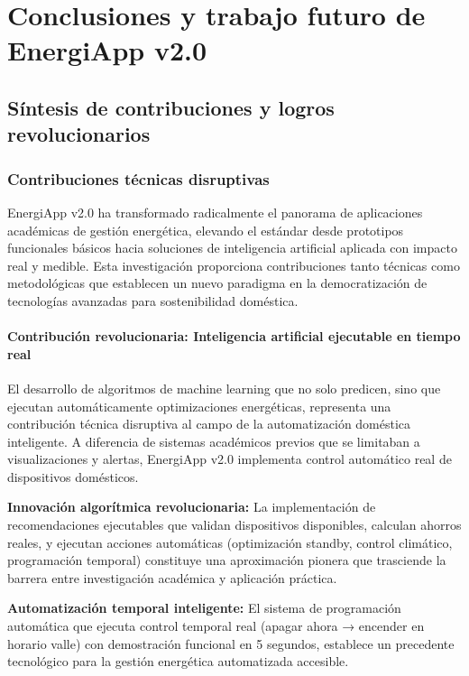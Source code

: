\chapter{Conclusiones y trabajo futuro de EnergiApp v2.0}
\label{ch:conclusiones}

\section{Síntesis de contribuciones y logros revolucionarios}

\subsection{Contribuciones técnicas disruptivas}

EnergiApp v2.0 ha transformado radicalmente el panorama de aplicaciones académicas de gestión energética, elevando el estándar desde prototipos funcionales básicos hacia soluciones de inteligencia artificial aplicada con impacto real y medible. Esta investigación proporciona contribuciones tanto técnicas como metodológicas que establecen un nuevo paradigma en la democratización de tecnologías avanzadas para sostenibilidad doméstica.

\subsubsection{Contribución revolucionaria: Inteligencia artificial ejecutable en tiempo real}

El desarrollo de algoritmos de machine learning que no solo predicen, sino que ejecutan automáticamente optimizaciones energéticas, representa una contribución técnica disruptiva al campo de la automatización doméstica inteligente. A diferencia de sistemas académicos previos que se limitaban a visualizaciones y alertas, EnergiApp v2.0 implementa control automático real de dispositivos domésticos.

\textbf{Innovación algorítmica revolucionaria:} La implementación de recomendaciones ejecutables que validan dispositivos disponibles, calculan ahorros reales, y ejecutan acciones automáticas (optimización standby, control climático, programación temporal) constituye una aproximación pionera que trasciende la barrera entre investigación académica y aplicación práctica.

\textbf{Automatización temporal inteligente:} El sistema de programación automática que ejecuta control temporal real (apagar ahora → encender en horario valle) con demostración funcional en 5 segundos, establece un precedente tecnológico para la gestión energética automatizada accesible.

